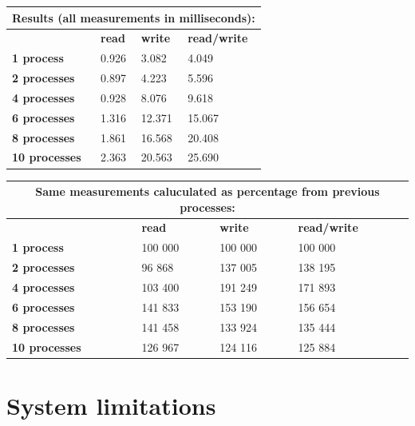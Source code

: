 \documentclass[final,a4paper]{article}
\begin{document}
\begin{table}[h!]
  \centering
  \begin{tabular}{|l|l|l|l|}
    \hline
    \multicolumn{4}{|c|}{\bf Results (all measurements in milliseconds):}\\
    \hline
    \hline
    & {\bf read } & { \bf write } & { \bf read/write } \\
    \hline
    { \bf 1 process }    & 0.926 &  3.082 &  4.049 \\
    \hline
    { \bf 2 processes }  & 0.897 &  4.223 &  5.596 \\
    \hline
    { \bf 4 processes }  & 0.928 &  8.076 &  9.618 \\
    \hline
    { \bf 6 processes }  & 1.316 & 12.371 & 15.067 \\
    \hline
    { \bf 8 processes }  & 1.861 & 16.568 & 20.408 \\
    \hline
    { \bf 10 processes } & 2.363 & 20.563 & 25.690 \\
    \hline
  \end{tabular}
\end{table}

\begin{table}[h!]
  \centering
  \begin{tabular}{|l|l|l|l|}
    \hline
    \multicolumn{4}{|c|}{\bf Same measurements caluculated as percentage from
      previous processes:}\\
    \hline
    \hline
    & {\bf read } & { \bf write } & { \bf read/write } \\
    \hline
    { \bf 1 process }    & 100 000 & 100 000 & 100 000 \\
    \hline
    { \bf 2 processes }  &  96 868 & 137 005 & 138 195 \\
    \hline
    { \bf 4 processes }  & 103 400 & 191 249 & 171 893 \\
    \hline
    { \bf 6 processes }  & 141 833 & 153 190 & 156 654 \\
    \hline
    { \bf 8 processes }  & 141 458 & 133 924 & 135 444 \\
    \hline
    { \bf 10 processes } & 126 967 & 124 116 & 125 884 \\
    \hline
  \end{tabular}
\end{table}


\section*{System limitations}
\end{document}
